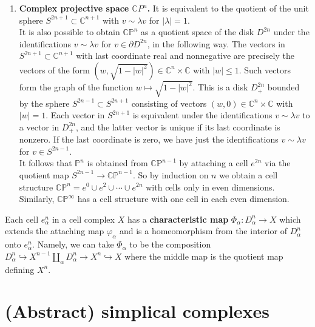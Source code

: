 \begin{example}
\begin{enumerate}
        \item \textbf{Complex projective space $\mathbb{C} P^n$.} It is equivalent to the quotient of the unit sphere $S^{2 n+1} \subset \mathbb{C}^{n+1}$ with $v \sim \lambda v$ for $|\lambda|=1$. \\
        It is also possible to obtain $\mathbb{C P}^n$ as a quotient space of the disk $D^{2 n}$ under the identifications $v \sim \lambda v$ for $v \in \partial D^{2 n}$, in the following way. The vectors in $S^{2 n+1} \subset \mathbb{C}^{n+1}$ with last coordinate real and nonnegative are precisely the vectors of the form $\left(w, \sqrt{1-|w|^2}\right) \in \mathbb{C}^n \times \mathbb{C}$ with $|w| \leq 1$. Such vectors form the graph of the function $w \mapsto \sqrt{1-|w|^2}$. This is a disk $D_{+}^{2 n}$ bounded by the sphere $S^{2 n-1} \subset S^{2 n+1}$ consisting of vectors $(w, 0) \in \mathbb{C}^n \times \mathbb{C}$ with $|w|=1$. Each vector in $S^{2 n+1}$ is equivalent under the identifications $v \sim \lambda v$ to a vector in $D_{+}^{2 n}$, and the latter vector is unique if its last coordinate is nonzero. If the last coordinate is zero, we have just the identifications $v \sim \lambda v$ for $v \in S^{2 n-1}$.\\
        It follows that $\mathbb{P}^n$ is obtained from $\mathbb{C} \mathrm{P}^{n-1}$ by attaching a cell $e^{2 n}$ via the quotient map $S^{2 n-1} \rightarrow \mathbb{C P}^{n-1}$. So by induction on $n$ we obtain a cell structure $\mathbb{C P}^n=e^0 \cup e^2 \cup \cdots \cup e^{2 n}$ with cells only in even dimensions. Similarly, $\mathbb{C P}^{\infty}$ has a cell structure with one cell in each even dimension.
    \end{enumerate}
\end{example}

Each cell $e_\alpha^n$ in a cell complex $X$ has a \textbf{characteristic map} $\Phi_\alpha: D_\alpha^n \rightarrow X$ which extends the attaching map $\varphi_\alpha$ and is a homeomorphism from the interior of $D_\alpha^n$ onto $e_\alpha^n$. Namely, we can take $\Phi_\alpha$ to be the composition $D_\alpha^n \hookrightarrow X^{n-1} \coprod_\alpha D_\alpha^n \rightarrow X^n \hookrightarrow X$ where the middle map is the quotient map defining $X^n$. 



\section{(Abstract) simplical complexes}

